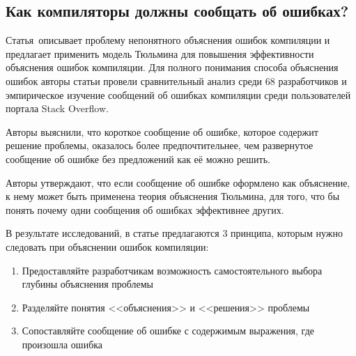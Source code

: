 \subsection{Как компиляторы должны сообщать об ошибках?} \label{subsection_Barik2018}
Статья\,\cite{Barik2018} описывает проблему непонятного объяснения ошибок компиляции и предлагает применить модель Тюльмина для повышения эффективности объяснения ошибок компиляции. Для полного понимания способа объяснения ошибок авторы статьи провели сравнительный анализ среди 68 разработчиков  и эмпирическое изучение сообщений об ошибках компиляции среди пользователей портала Stack Overflow.

Авторы выяснили, что короткое сообщение об ошибке, которое содержит решение проблемы, оказалось более предпочтительнее, чем развернутое сообщение об ошибке без предложений как её можно решить. 

Авторы утверждают, что если сообщение об ошибке оформлено как объяснение, к нему может быть применена теория объяснения Тюльмина, для того, что бы понять почему одни сообщения об ошибках эффективнее других.

В результате исследований, в статье предлагаются 3 принципа, которым нужно следовать при объяснении ошибок компиляции: 

\begin{enumerate} 
	\item{Предоставляйте разработчикам возможность самостоятельного выбора глубины объяснения проблемы}
	\item{Разделяйте понятия <<объяснения>> и <<решения>> проблемы}
	\item{Сопоставляйте сообщение об ошибке с содержимым выражения, где произошла ошибка}
\end{enumerate}


\todo{}